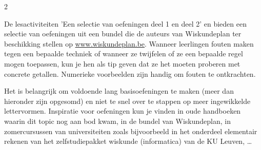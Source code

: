 
\begin{multicols}{2}

De lesactiviteiten 'Een selectie van oefeningen deel 1 en deel 2' en bieden een selectie van oefeningen uit een bundel die de auteurs van Wiskundeplan ter beschikking stellen op \url{www.wiskundeplan.be}. Wanneer leerlingen fouten maken tegen een bepaalde techniek of wanneer ze twijfelen of ze een bepaalde regel mogen toepassen, kun je hen als tip geven dat ze het moeten proberen met concrete getallen. Numerieke voorbeelden zijn handig om fouten te ontkrachten.

Het is belangrijk om voldoende lang basisoefeningen te maken (meer dan hieronder zijn opgesomd) en niet te snel over te stappen op meer ingewikkelde lettervormen. Inspiratie voor oefeningen kun je vinden in oude handboeken waarin dit topic nog aan bod kwam, in de bundel van Wiskundeplan, in zomercursussen van universiteiten zoals bijvoorbeeld in het onderdeel elementair rekenen van het zelfstudiepakket wiskunde (informatica) van de KU Leuven, \ldots

\end{multicols}

